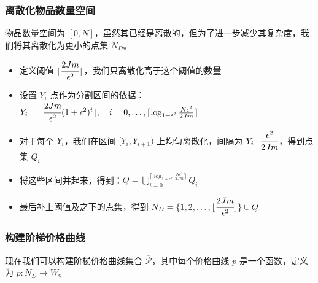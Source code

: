 \subsubsection{离散化物品数量空间}

物品数量空间为 $[0, N]$，虽然其已经是离散的，但为了进一步减少其复杂度，我们将其离散化为更小的点集 $N_D$。

\begin{itemize}
    \item 定义阈值 $\lfloor \cfrac{2Jm}{\epsilon^2}\rfloor$，我们只离散化高于这个阈值的数量
    \item 设置 $Y_i$ 点作为分割区间的依据：$Y_i = \lfloor\cfrac{2Jm}{\epsilon^2}(1+\epsilon^2)^i\rfloor,\quad i=0,\ldots, \lceil\log_{1+\epsilon^2} \frac{N\epsilon^2}{2Jm}\rceil$
    \item 对于每个 $Y_i$，我们在区间 $[Y_i, Y_{i+1})$ 上均匀离散化，间隔为 $Y_i\cdot \cfrac{\epsilon^2}{2Jm}$，得到点集 $Q_i$
    \item 将这些区间并起来，得到：$Q = \bigcup_{i=0}^{\lceil\log_{1+\epsilon^2} \frac{N\epsilon^2}{2Jm}\rceil} Q_i$
    \item 最后补上阈值及之下的点集，得到 $N_D = \{1, 2, \ldots, \lfloor \cfrac{2Jm}{\epsilon^2} \rfloor\} \cup Q$
\end{itemize}

\subsubsection{构建阶梯价格曲线}

现在我们可以构建阶梯价格曲线集合 $\overline{\mathcal{P}}$，其中每个价格曲线 $p$ 是一个函数，定义为 $p: N_D \to W$。

